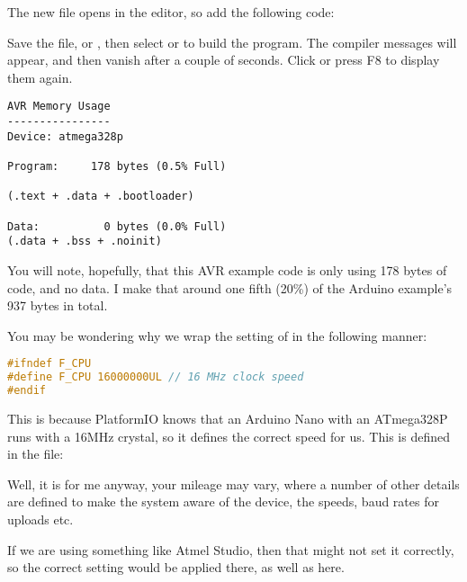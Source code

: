 The new file opens in the editor, so add the following code:



Save the file,  or , then select
 or  to build the program. The
compiler messages will appear, and then vanish after a couple of
seconds. Click  or press F8
to display them again.

\begin{lstlisting}[numbers={none},caption={AVR Blink Memory Usage}]
AVR Memory Usage
----------------
Device: atmega328p

Program:     178 bytes (0.5% Full)

(.text + .data + .bootloader)

Data:          0 bytes (0.0% Full)
(.data + .bss + .noinit)\end{lstlisting}

You will note, hopefully, that this AVR example code is only using 178 bytes of code, and no data. I make that around one fifth (20\%) of the  Arduino example's 937 bytes in total.

You may be wondering why we wrap the setting of  in the following manner:

\begin{lstlisting}[language=C,firstnumber=2,caption={Wrapping F\_CPU in AVRBlink.c}]
#ifndef F_CPU
#define F_CPU 16000000UL // 16 MHz clock speed
#endif
\end{lstlisting}

This is because PlatformIO knows that an Arduino Nano with an ATmega328P runs with a 16MHz crystal, so it defines the correct speed for us. This is defined in the file:


Well, it is for me anyway, your mileage may vary, where a number of other details are defined to make the system aware of the device, the speeds, baud rates for uploads etc.

If we are using something like Atmel Studio, then that might not set it correctly, so the correct setting would be applied there, as well as here.

